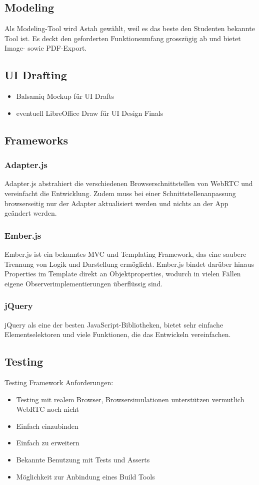 \subsection{Modeling}
Als Modeling-Tool wird Astah gewählt, weil es das beste den Studenten
bekannte Tool ist.
Es deckt den geforderten Funktionsumfang grosszügig ab und bietet Image- sowie
PDF-Export.

\subsection{UI Drafting}
\begin{itemize}
	\setlength{\itemsep}{-\parsep}
	\item Balsamiq Mockup für UI Drafts
	\item eventuell LibreOffice Draw für UI Design Finals
\end{itemize}


\subsection{Frameworks}
\subsubsection{Adapter.js}
Adapter.js abstrahiert die verschiedenen Browserschnittstellen von WebRTC und vereinfacht die Entwicklung. Zudem muss bei einer Schnittstellenanpassung browserseitig nur der Adapter aktualisiert werden und nichts an der App geändert werden.

\subsubsection{Ember.js}
Ember.js ist ein bekanntes MVC und Templating Framework, das eine saubere Trennung von Logik und Darstellung ermöglicht. Ember.js bindet darüber hinaus Properties im Template direkt an Objektproperties, wodurch in vielen Fällen eigene Observerimplementierungen überflüssig sind.

\subsubsection{jQuery}
jQuery als eine der besten JavaScript-Bibliotheken, bietet sehr einfache
Elementselektoren und viele Funktionen, die das Entwickeln vereinfachen.


\subsection{Testing}
Testing Framework Anforderungen:
\begin{itemize}
	\setlength{\itemsep}{-\parsep}
	\item Testing mit realem Browser, Browsersimulationen unterstützen vermutlich WebRTC noch nicht
	\item Einfach einzubinden
	\item Einfach zu erweitern
	\item Bekannte Benutzung mit Tests und Asserts
	\item Möglichkeit zur Anbindung eines Build Tools
\end{itemize}

